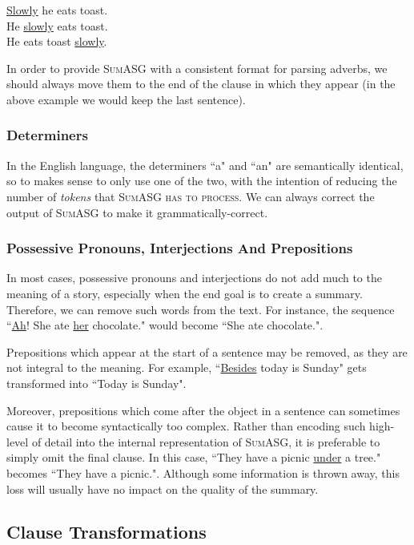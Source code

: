 \begin{displayquote}
\underline{Slowly} he eats toast. \\
He \underline{slowly} eats toast. \\
He eats toast \underline{slowly}.
\end{displayquote}

In order to provide \textsc{SumASG} with a consistent format for parsing adverbs, we should always move them to the end of the clause in which they appear (in the above example we would keep the last sentence).


\subsubsection{Determiners}

In the English language, the determiners ``a" and ``an" are semantically identical, so to makes sense to only use one of the two, with the intention of reducing the number of \textit{tokens} that \textsc{SumASG has to process}. We can always correct the output of \textsc{SumASG} to make it grammatically-correct.

\subsubsection{Possessive Pronouns, Interjections And Prepositions}

In most cases, possessive pronouns and interjections do not add much to the meaning of a story, especially when the end goal is to create a summary. Therefore, we can remove such words from the text. For instance, the sequence ``\underline{Ah}! She ate \underline{her} chocolate." would become ``She ate chocolate.".

Prepositions which appear at the start of a sentence may be removed, as they are not integral to the meaning. For example, ``\underline{Besides} today is Sunday" gets transformed into ``Today is Sunday".

Moreover, prepositions which come after the object in a sentence can sometimes cause it to become syntactically too complex. Rather than encoding such high-level of detail into the internal representation of \textsc{SumASG}, it is preferable to simply omit the final clause. In this case, ``They have a picnic \underline{under} a tree." becomes ``They have a picnic.". Although some information is thrown away, this loss will usually have no impact on the quality of the summary.

\subsection{Clause Transformations}

